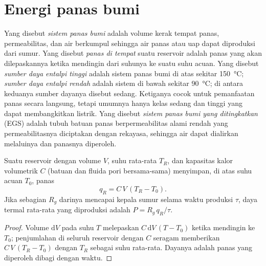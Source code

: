 \section{Energi panas bumi}\label{sec:b2:energy-geology:geothermal}

\begin{definition}\label{def:b2:energy-geology:geothermal}
Yang disebut \emph{sistem panas bumi} adalah volume kerak tempat panas,
permeabilitas, dan air berkumpul sehingga air panas atau uap dapat diproduksi dari sumur. Yang disebut
\emph{panas di tempat} suatu reservoir adalah panas yang akan dilepaskannya ketika mendingin
dari suhunya ke suatu suhu acuan. Yang disebut \emph{sumber daya entalpi tinggi}
adalah sistem panas bumi di atas sekitar \qty{150}{\celsius}; \emph{sumber daya entalpi
rendah} adalah sistem di bawah sekitar \qty{90}{\celsius}; di antara keduanya
sumber dayanya disebut sedang. Ketiganya cocok untuk pemanfaatan panas secara langsung, tetapi umumnya hanya kelas sedang
dan tinggi yang dapat membangkitkan listrik. Yang disebut \emph{sistem panas bumi yang ditingkatkan} (EGS) adalah tubuh
batuan panas berpermeabilitas alami rendah yang permeabilitasnya diciptakan dengan rekayasa, sehingga air
dapat dialirkan melaluinya dan panasnya diperoleh.
\end{definition}

\begin{proposition}\label{prop:b2:energy-geology:heat}
Suatu reservoir dengan volume $V$, suhu rata-rata $T_R$, dan kapasitas kalor volumetrik $C$ (batuan dan fluida pori
bersama-sama) menyimpan, di atas suhu acuan $T_0$, panas
\begin{equation}
q_R = C\,V\,(T_R - T_0) .
\label{eq:b2:energy-geology:heat}
\end{equation}
Jika sebagian $R_g$ darinya mencapai kepala sumur selama waktu produksi $\tau$, daya termal rata-rata
yang diproduksi adalah $P = R_g\,q_R/\tau$.
\end{proposition}

\begin{proof}
Volume $\mathrm{d}V$ pada suhu $T$ melepaskan $C\,\mathrm{d}V\,(T - T_0)$ ketika mendingin ke $T_0$;
penjumlahan di seluruh reservoir dengan $C$ seragam memberikan $C\,V\,(T_R - T_0)$ dengan $T_R$ sebagai suhu
rata-rata. Dayanya adalah panas yang diperoleh dibagi dengan waktu.
\end{proof}

